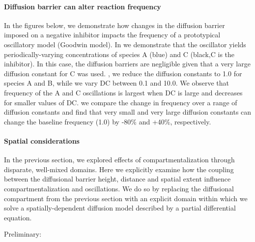 \paragraph*{Diffusion barrier can alter reaction frequency} 
In the figures below, we demonstrate how changes in the diffusion barrier imposed on a negative inhibitor impacts the frequency of a prototypical oscillatory model (Goodwin model). 
In  we demonstrate that the oscillator yields periodically-varying concentrations of species A (blue) and C (black,C is the inhibitor). In this case, the diffusion barriers are negligible given that a very large diffusion constant for C was used. , we reduce the diffusion constants to 1.0 for species A and B, while we vary DC between 0.1 and 10.0. We observe that frequency of the A and C oscillations is largest when DC is large and decreases for smaller values of DC.  we compare the change in frequency over a range of diffusion constants and find that very small and very large diffusion constants can change the baseline frequency (1.0) by -80\% and +40\%, respectively. 


\paragraph{Spatial considerations} 
In the previous section, we explored effects of compartmentalization through disparate, well-mixed domains. 
Here we explicitly examine how the coupling between the diffusional barrier height, distance and spatial extent influence compartmentalization and oscillations. 
We do so by replacing the diffusional compartment from the previous section with an explicit domain within which we solve a spatially-dependent diffusion model described by a partial differential equation. 

Preliminary:


